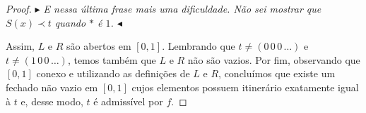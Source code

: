 \begin{proof}
\textit{$\blacktriangleright$ E nessa última frase mais uma dificuldade. Não sei mostrar que $S(x) \prec t$ quando $*$ é $1$.  $\blacktriangleleft$}

Assim, $L$ e $R$ são abertos em $[0, 1]$. Lembrando que $t \neq (0\, 0\, 0\, \dots)$ e $t \neq (1\, 0\, 0\, \dots)$, temos também que $L$ e $R$ não são vazios. Por fim, observando que $[0, 1]$ conexo e utilizando as definições de $L$ e $R$, concluímos que existe um fechado não vazio em $[0, 1]$ cujos elementos possuem itinerário exatamente igual à $t$ e, desse modo, $t$ é admissível por $f$.
\end{proof}












